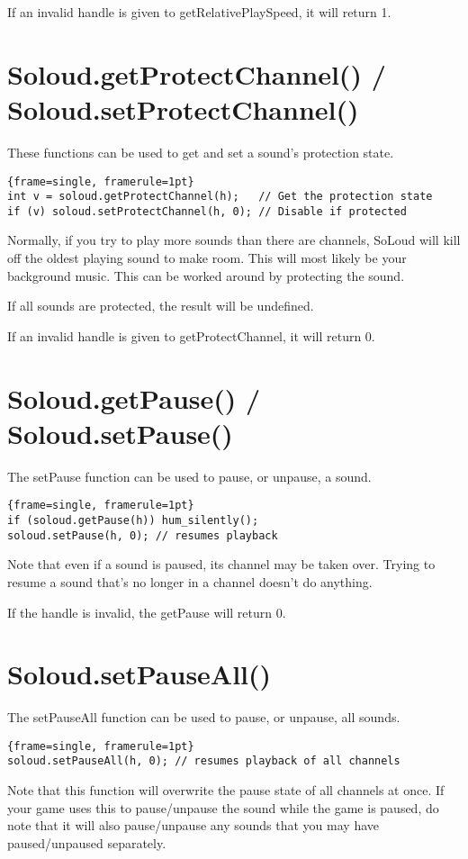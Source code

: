 If an invalid handle is given to getRelativePlaySpeed, it will return 1.

\section{Soloud.getProtectChannel() / Soloud.setProtectChannel()}

These functions can be used to get and set a sound's protection state.

\begin{lstlisting}{frame=single, framerule=1pt}
int v = soloud.getProtectChannel(h);   // Get the protection state
if (v) soloud.setProtectChannel(h, 0); // Disable if protected
\end{lstlisting}

Normally, if you try to play more sounds than there are channels, SoLoud will kill off the oldest playing sound to make room. This will most likely be your background music. This can be worked around by protecting the sound.

If all sounds are protected, the result will be undefined.

If an invalid handle is given to getProtectChannel, it will return 0.

\section{Soloud.getPause() / Soloud.setPause()}

The setPause function can be used to pause, or unpause, a sound.

\begin{lstlisting}{frame=single, framerule=1pt}
if (soloud.getPause(h)) hum_silently();
soloud.setPause(h, 0); // resumes playback
\end{lstlisting}

Note that even if a sound is paused, its channel may be taken over. Trying to resume a sound that's no longer in a channel doesn't do anything.

If the handle is invalid, the getPause will return 0.

\section{Soloud.setPauseAll()}

The setPauseAll function can be used to pause, or unpause, all sounds.

\begin{lstlisting}{frame=single, framerule=1pt}
soloud.setPauseAll(h, 0); // resumes playback of all channels
\end{lstlisting}

Note that this function will overwrite the pause state of all channels at once. If your game uses this to pause/unpause the sound while the game is paused, do note that it will also pause/unpause any sounds that you may have paused/unpaused separately.